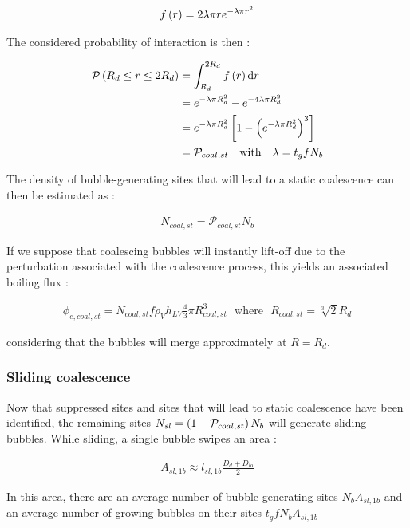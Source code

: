 \begin{align}
f\left( r \right)=2\lambda \pi r e^{-\lambda \pi r^{2}}
\end{align} 

The considered probability of interaction is then :

\begin{align}
\mathcal{P}\parth{R_{d}\leq r \leq 2R_{d}} &=\int_{R_{d}}^{2R_{d}}f\parth{r} \mathrm{d}r \\
%
&= e^{-\lambda \pi R_{d}^{2}} - e^{-4\lambda \pi R_{d}^{2}}\\
%
&= e^{-\lambda \pi R_{d}^{2}}\crocht{1-\parth{e^{-\lambda \pi R_{d}^{2}}}^{3}} \\
&= \mathcal{P}_{coal,st} \ \ \ \text{with}\ \ \ \lambda=t_{g} f N_{b}
\end{align}

The density of bubble-generating sites that will lead to a static coalescence can then be estimated as :

\begin{align}
N_{coal,st}=\mathcal{P}_{coal,st}N_{b}
\end{align}

If we suppose that coalescing bubbles will instantly lift-off due to the perturbation associated with the coalescence process, this yields an associated boiling flux :

\begin{align}
\phi_{e,coal,st}=N_{coal,st} f \rho_{V}h_{LV} \frac{4}{3}\pi R_{coal,st}^{3} \ \ \ \text{where}\ \ \ R_{coal,st}=\sqrt[3]{2}R_{d} 
\end{align}

considering that the bubbles will merge approximately at $R=R_{d}$.

\subsubsection{Sliding coalescence}

Now that suppressed sites and sites that will lead to static coalescence have been identified, the remaining sites $N_{sl}=\left( 1-\mathcal{P}_{coal,st} \right)N_{b}$ will generate sliding bubbles. While sliding, a single bubble swipes an area :

\begin{align}
A_{sl, 1b} \approx l_{sl,1b}\frac{D_{d}+D_{lo}}{2}
\end{align}

In this area, there are an average number of bubble-generating sites $N_{b}A_{sl,1b}$ and an average number of growing bubbles on their sites $t_{g}f N_{b}A_{sl,1b}$

